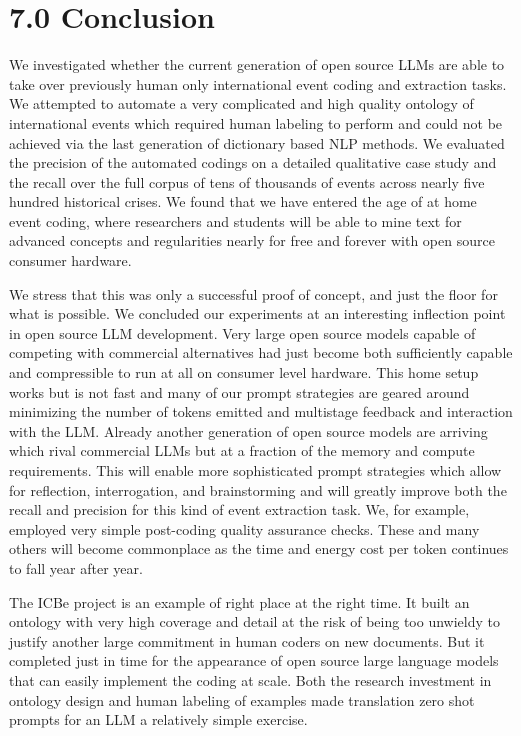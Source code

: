 \documentclass[
  letterpaper,
  DIV=11,
  numbers=noendperiod]{scrartcl}
\begin{document}
\hypertarget{conclusion}{%
\section{7.0 Conclusion}\label{conclusion}}

We investigated whether the current generation of open source LLMs are
able to take over previously human only international event coding and
extraction tasks. We attempted to automate a very complicated and high
quality ontology of international events which required human labeling
to perform and could not be achieved via the last generation of
dictionary based NLP methods. We evaluated the precision of the
automated codings on a detailed qualitative case study and the recall
over the full corpus of tens of thousands of events across nearly five
hundred historical crises. We found that we have entered the age of at
home event coding, where researchers and students will be able to mine
text for advanced concepts and regularities nearly for free and forever
with open source consumer hardware.

We stress that this was only a successful proof of concept, and just the
floor for what is possible. We concluded our experiments at an
interesting inflection point in open source LLM development. Very large
open source models capable of competing with commercial alternatives had
just become both sufficiently capable and compressible to run at all on
consumer level hardware. This home setup works but is not fast and many
of our prompt strategies are geared around minimizing the number of
tokens emitted and multistage feedback and interaction with the LLM.
Already another generation of open source models are arriving which
rival commercial LLMs but at a fraction of the memory and compute
requirements. This will enable more sophisticated prompt strategies
which allow for reflection, interrogation, and brainstorming and will
greatly improve both the recall and precision for this kind of event
extraction task. We, for example, employed very simple post-coding
quality assurance checks. These and many others will become commonplace
as the time and energy cost per token continues to fall year after year.

The ICBe project is an example of right place at the right time. It
built an ontology with very high coverage and detail at the risk of
being too unwieldy to justify another large commitment in human coders
on new documents. But it completed just in time for the appearance of
open source large language models that can easily implement the coding
at scale. Both the research investment in ontology design and human
labeling of examples made translation zero shot prompts for an LLM a
relatively simple exercise.
\end{document}
